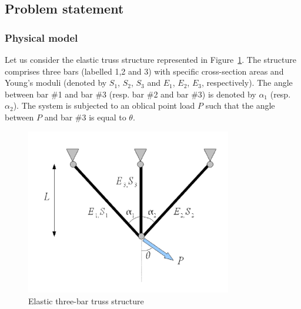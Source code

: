 \documentclass[11pt]{article}
\begin{document}
\subsection{Problem statement}

\subsubsection{Physical model}

Let us consider the elastic truss structure represented in Figure~\ref{fig_treillis}. The structure comprises three bars (labelled 1,2 and 3) with specific cross-section areas and Young's moduli (denoted by $S_1$, $S_2$, $S_3$ and $E_1$, $E_2$, $E_3$, respectively). The angle between bar \#1 and bar \#3 (resp. bar \#2 and bar \#3) is denoted by $\alpha_1$ (resp. $\alpha_2$). The system is subjected to an oblical point load $P$ such that the angle between $P$ and bar \#3 is equal to $\theta$.

\begin{figure}[Hhbtp]
  \begin{center}
    \includegraphics[width=9cm]{Figures/Treillis.pdf}
  \end{center}
  \caption{Elastic three-bar truss structure}
  \label{fig_treillis}
\end{figure}
\end{document}
